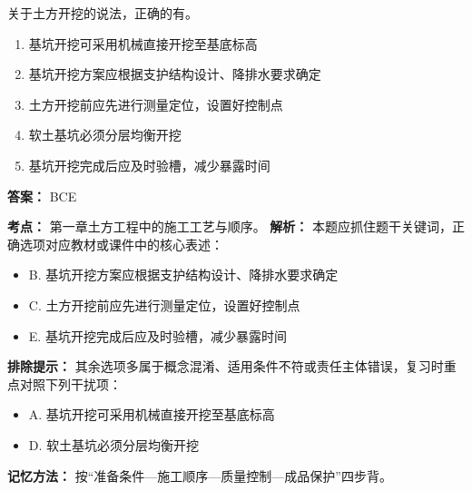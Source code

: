 \documentclass[UTF8,fontset=fandol,11pt]{ctexart}
\begin{document}
\begin{quizbox}[title={第 14 题}]
关于土方开挖的说法，正确的有。\\
\begin{enumerate}[label=\Alph*.]
\item 基坑开挖可采用机械直接开挖至基底标高
\item 基坑开挖方案应根据支护结构设计、降排水要求确定
\item 土方开挖前应先进行测量定位，设置好控制点
\item 软土基坑必须分层均衡开挖
\item 基坑开挖完成后应及时验槽，减少暴露时间
\end{enumerate}
\textbf{答案：} BCE
\vspace{0.25em}
\begin{answerbox}[title={考点解析}]
\textbf{考点：} 第一章土方工程中的施工工艺与顺序。
\textbf{解析：} 本题应抓住题干关键词，正确选项对应教材或课件中的核心表述：
\begin{itemize}
\item B. 基坑开挖方案应根据支护结构设计、降排水要求确定
\item C. 土方开挖前应先进行测量定位，设置好控制点
\item E. 基坑开挖完成后应及时验槽，减少暴露时间
\end{itemize}
\textbf{排除提示：} 其余选项多属于概念混淆、适用条件不符或责任主体错误，复习时重点对照下列干扰项：
\begin{itemize}
\item A. 基坑开挖可采用机械直接开挖至基底标高
\item D. 软土基坑必须分层均衡开挖
\end{itemize}
\textbf{记忆方法：} 按“准备条件—施工顺序—质量控制—成品保护”四步背。
\end{answerbox}
\end{quizbox}
\end{document}
